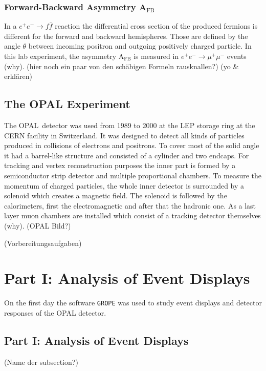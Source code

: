\documentclass[11pt, a4paper]{article}
\numberwithin{equation}{section}
\newcommand{\korr}[1]{{\color{red}(#1)}}
\begin{document}
\subsubsection{Forward-Backward Asymmetry A$_\mathrm{FB}$}

In a $e^+e^- \rightarrow f\bar{f}$ reaction the differential cross section of the produced fermions is different for the forward and backward hemispheres.
Those are defined by the angle $\theta$ between incoming positron and outgoing positively charged particle.
In this lab experiment, the asymmetry A$_\mathrm{FB}$ is measured in $e^+e^- \rightarrow \mu^+\mu^-$ events \korr{why}. 
\korr{hier noch ein paar von den schäbigen Formeln rausknallen?} \korr{yo \& erklären}

\subsection{The OPAL Experiment}

The OPAL~detector was used from 1989 to 2000 at the LEP storage ring at the CERN facility in Switzerland.
It was designed to detect all kinds of particles produced in collisions of electrons and positrons.
To cover most of the solid angle it had a barrel-like structure and consisted of a cylinder and two endcaps.
For tracking and vertex reconstruction purposes the inner part is formed by a semiconductor strip detector and multiple proportional chambers.
To measure the momentum of charged particles, the whole inner detector is surrounded by a solenoid which creates a magnetic field.
The solenoid is followed by the calorimeters, first the electromagnetic and after that the hadronic one.
As a last layer muon chambers are installed which consist of a tracking detector themselves \korr{why}.
\korr{OPAL Bild?}


\korr{Vorbereitungsaufgaben}
\section{Part I: Analysis of Event Displays}

On the first day the software \texttt{GROPE} was used to study event displays and detector responses of the OPAL detector.

\subsection{Part I: Analysis of Event Displays}
\korr{Name der subsection?}
\end{document}
